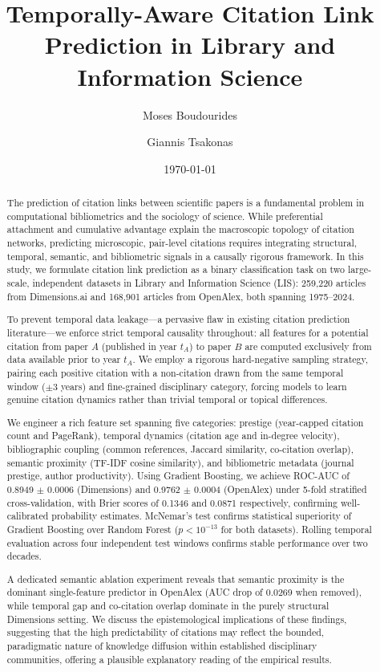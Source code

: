 \documentclass[12pt,a4paper]{article}
\title{\textbf{Temporally-Aware Citation Link Prediction in Library and Information Science}}
\author[1]{Moses Boudourides}
\author[2]{Giannis Tsakonas}
\affil[1]{Department of Mathematics, University of Patras, Greece\\
  \texttt{m.boudourides@upatras.gr}}
\affil[2]{Library \& Information Center, University of Patras, Greece\\
  \texttt{gtsakonas@upatras.gr}}
\date{\today}
\begin{document}
\maketitle
\thispagestyle{empty}

\begin{abstract}
\noindent
The prediction of citation links between scientific papers is a fundamental problem
in computational bibliometrics and the sociology of science. While preferential
attachment and cumulative advantage explain the macroscopic topology of citation
networks, predicting microscopic, pair-level citations requires integrating
structural, temporal, semantic, and bibliometric signals in a causally rigorous
framework. In this study, we formulate citation link prediction as a binary
classification task on two large-scale, independent datasets in Library and
Information Science (LIS): 259,220 articles from Dimensions.ai and 168,901 articles
from OpenAlex, both spanning 1975--2024.

To prevent temporal data leakage---a pervasive flaw in existing citation prediction
literature---we enforce strict temporal causality throughout: all features for a
potential citation from paper $A$ (published in year $t_A$) to paper $B$ are
computed exclusively from data available prior to year $t_A$. We employ a rigorous
hard-negative sampling strategy, pairing each positive citation with a non-citation
drawn from the same temporal window ($\pm 3$ years) and fine-grained disciplinary
category, forcing models to learn genuine citation dynamics rather than trivial
temporal or topical differences.

We engineer a rich feature set spanning five categories: prestige (year-capped
citation count and PageRank), temporal dynamics (citation age and in-degree
velocity), bibliographic coupling (common references, Jaccard similarity, co-citation
overlap), semantic proximity (TF-IDF cosine similarity), and bibliometric metadata
(journal prestige, author productivity). Using Gradient Boosting, we achieve
ROC-AUC of 0.8949 $\pm$ 0.0006 (Dimensions) and 0.9762 $\pm$ 0.0004 (OpenAlex) under 5-fold stratified cross-validation, with Brier scores of 0.1346 and 0.0871 respectively, confirming well-calibrated probability estimates. McNemar's test confirms statistical superiority of Gradient Boosting over Random Forest ($p < 10^{-13}$ for both datasets). Rolling temporal evaluation across four independent test windows confirms stable performance over two decades.

A dedicated semantic ablation experiment reveals that semantic proximity is the
dominant single-feature predictor in OpenAlex (AUC drop of 0.0269 when removed), while temporal gap and co-citation overlap dominate in the purely structural Dimensions setting. We discuss the epistemological implications of these findings, suggesting that the high predictability of citations may reflect the bounded, paradigmatic nature of knowledge diffusion within established disciplinary communities, offering a plausible explanatory reading of the empirical results.
\end{abstract}
\end{document}

